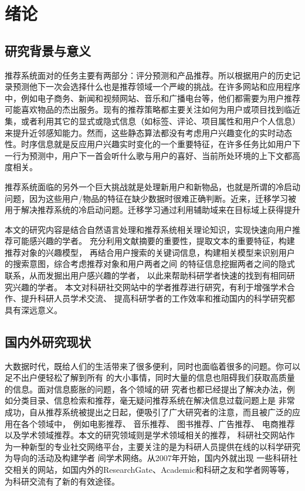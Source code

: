 \chapter{绪论}
\section{研究背景与意义}

推荐系统面对的任务主要有两部分：评分预测和产品推荐。所以根据用户的历史记录预测他下一次会选择什么也是推荐领域一个严峻的挑战。在许多网站和应用程序中，例如电子商务、新闻和视频网站、音乐和广播电台等，他们都需要为用户推荐可能喜欢物品的杰出服务。现有的推荐策略都主要关注如何为用户或项目找到临近集，或者利用其它的显式或隐式信息（如标签、评论、项目属性和用户个人信息）来提升近邻感知能力。然而，这些静态算法都没有考虑用户兴趣变化的实时动态性。时序信息就是反应用户兴趣实时变化的一个重要特征，在许多任务比如用户下一行为预测中，用户下一首会听什么歌与用户的喜好、当前所处环境的上下文都高度相关。

推荐系统面临的另外一个巨大挑战就是处理新用户和新物品，也就是所谓的冷启动问题，因为这些用户/物品的特征在缺少数据时很难正确判断。近来，迁移学习被用于解决推荐系统的冷启动问题。迁移学习通过利用辅助域来在目标域上获得提升



本文的研究内容是结合自然语言处理和推荐系统相关理论知识，实现快速向用户推荐可能感兴趣的学者。%
充分利用文献摘要的重要性，提取文本的重要特征，构建推荐对象的兴趣模型，%
再结合用户搜索的关键词信息，构建相关模型来识别用户的搜索意图，综合考虑推荐对象和用户两者之间%
的特征信息挖掘两者之间的隐式联系，从而发掘出用户感兴趣的学者，
以此来帮助科研学者快速的找到有相同研究兴趣的学者。%
本文对科研社交网站中的学者推荐进行研究，有利于增强学术合作、提升科研人员学术交流、%
提高科研学者的工作效率和推动国内的科学研究都具有深远意义。

\section{国内外研究现状}
大数据时代，既给人们的生活带来了很多便利，同时也面临着很多的问题。你可以足不出户便轻松了解到所有%
的大小事情，同时大量的信息也阻碍我们获取高质量的信息。面对信息膨胀的问题，各个领域的研%
究者也都已经提出了解决办法，例如分类目录、信息检索和推荐，毫无疑问推荐系统在解决信息过载问题上是%
非常成功，自从推荐系统被提出之日起，便吸引了广大研究者的注意，而且被广泛的应用在各个领域中，%
例如电影推荐、%
音乐推荐、%
图书推荐、广告推荐、%
电商推荐以及学术领域推荐。本文的研究领域则是学术领域相关的推荐，%
科研社交网站作为一种新型的专业社交网络平台，主要关注的是为科研人员提供在线的以科学研究为导向的活动及构建学者%
间学术网络。从2007年开始，国内外就出现%
一些科研社交相关的网站，如国内外的ResearchGate、Academic和科研之友和学者网等等，%
为科研交流有了新的有效途径。

